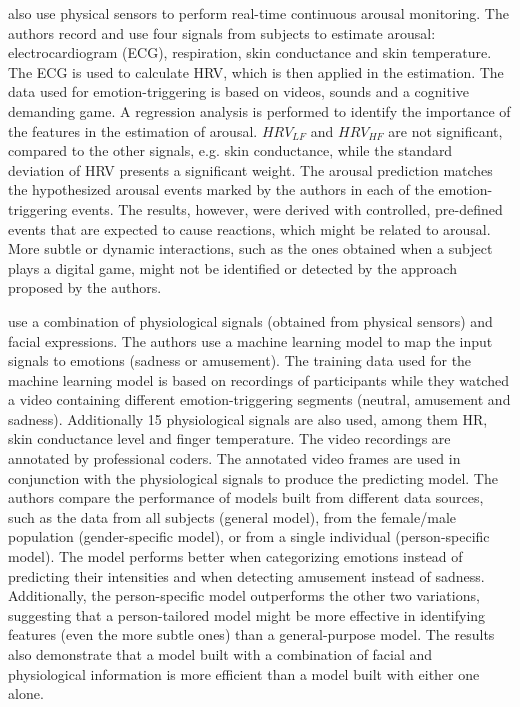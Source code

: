 \textcite{grundlehner2009design} also use physical sensors to perform real-time continuous arousal monitoring. The authors record and use four signals from subjects to estimate arousal: electrocardiogram (ECG), respiration, skin conductance and skin temperature. The ECG is used to calculate HRV, which is then applied in the estimation. The data used for emotion-triggering is based on videos, sounds and a cognitive demanding game. A regression analysis is performed to identify the importance of the features in the estimation of arousal. $HRV_{LF}$ and $HRV_{HF}$ are not significant, compared to the other signals, e.g. skin conductance, while the standard deviation of HRV presents a significant weight. The arousal prediction matches the hypothesized arousal events marked by the authors in each of the emotion-triggering events. The results, however, were derived with controlled, pre-defined events that are expected to cause reactions, which might be related to arousal. More subtle or dynamic interactions, such as the ones obtained when a subject plays a digital game, might not be identified or detected by the approach proposed by the authors.

\textcite{bailenson2008real} use a combination of physiological signals (obtained from physical sensors) and facial expressions. The authors use a machine learning model to map the input signals to emotions (sadness or amusement). The training data used for the machine learning model is based on recordings of participants while they watched a video containing different emotion-triggering segments (neutral, amusement and sadness). Additionally 15 physiological signals are also used, among them HR, skin conductance level and finger temperature. The video recordings are annotated by professional coders. The annotated video frames are used in conjunction with the physiological signals to produce the predicting model. The authors compare the performance of models built from different data sources, such as the data from all subjects (general model), from the female/male population (gender-specific model), or from a single individual (person-specific model). The model performs better when categorizing emotions instead of predicting their intensities and when detecting amusement instead of sadness. Additionally, the person-specific model outperforms the other two variations, suggesting that a person-tailored model might be more effective in identifying features (even the more subtle ones) than a general-purpose model. The results also demonstrate that a model built with a combination of facial and physiological information is more efficient than a model built with either one alone.

